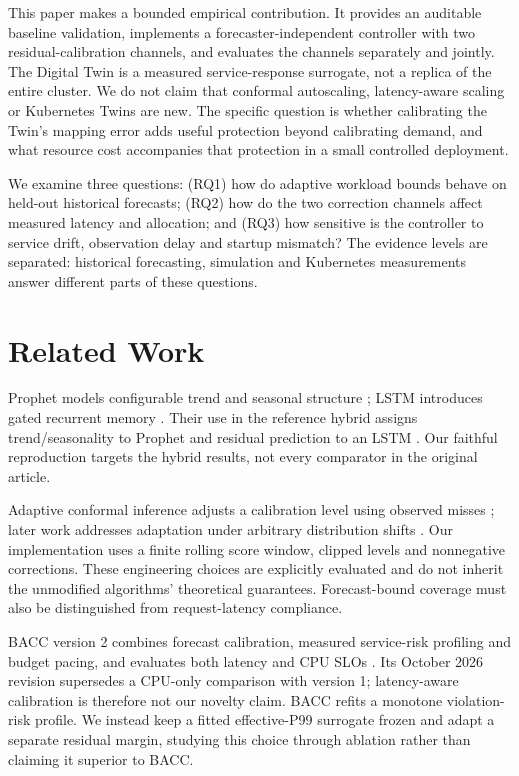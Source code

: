\documentclass[11pt,a4paper]{article}
\begin{document}
This paper makes a bounded empirical contribution. It provides an auditable baseline validation, implements a forecaster-independent controller with two residual-calibration channels, and evaluates the channels separately and jointly. The Digital Twin is a measured service-response surrogate, not a replica of the entire cluster. We do not claim that conformal autoscaling, latency-aware scaling or Kubernetes Twins are new. The specific question is whether calibrating the Twin's mapping error adds useful protection beyond calibrating demand, and what resource cost accompanies that protection in a small controlled deployment.

We examine three questions: (RQ1) how do adaptive workload bounds behave on held-out historical forecasts; (RQ2) how do the two correction channels affect measured latency and allocation; and (RQ3) how sensitive is the controller to service drift, observation delay and startup mismatch? The evidence levels are separated: historical forecasting, simulation and Kubernetes measurements answer different parts of these questions.

\section{Related Work}
Prophet models configurable trend and seasonal structure \cite{prophet}; LSTM introduces gated recurrent memory \cite{lstm}. Their use in the reference hybrid assigns trend/seasonality to Prophet and residual prediction to an LSTM \cite{guruge}. Our faithful reproduction targets the hybrid results, not every comparator in the original article.

Adaptive conformal inference adjusts a calibration level using observed misses \cite{aci}; later work addresses adaptation under arbitrary distribution shifts \cite{online}. Our implementation uses a finite rolling score window, clipped levels and nonnegative corrections. These engineering choices are explicitly evaluated and do not inherit the unmodified algorithms' theoretical guarantees. Forecast-bound coverage must also be distinguished from request-latency compliance.

BACC version 2 combines forecast calibration, measured service-risk profiling and budget pacing, and evaluates both latency and CPU SLOs \cite{bacc}. Its October 2026 revision supersedes a CPU-only comparison with version 1; latency-aware calibration is therefore not our novelty claim. BACC refits a monotone violation-risk profile. We instead keep a fitted effective-P99 surrogate frozen and adapt a separate residual margin, studying this choice through ablation rather than claiming it superior to BACC.
\end{document}
